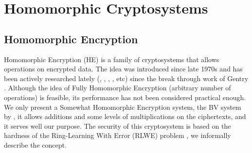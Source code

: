 
\section{Homomorphic Cryptosystems}
\label{sec:defHomo}

\subsection{Homomorphic Encryption}
Homomorphic Encryption (HE) is a family of cryptosystems that allows operations
on encrypted data. The idea was introduced since late 1970s
\cite{rivest1978data} and has been actively researched lately
(\cite{smart2014fully}, \cite{van2010fully}, \cite{EPRINT:SteSte10},
\cite{gentry2013homomorphic}, etc) since the break through work of Gentry
\cite{homenc}.  Although the idea of Fully Homomorphic Encryption (arbitrary
number of operations) is feasible, its performance has not been considered
practical enough. We only present a Somewhat Homomorphic Encryption system, the
BV system by \cite{brakerski2011fully}, it allows additions and some levels of
multiplications on the ciphertexts, and it serves well our purpose. The security
of this cryptosystem is based on the hardness of the Ring-Learning With Error
(RLWE) problem \cite{lyubashevsky2010ideal}, we informally describe the concept.
